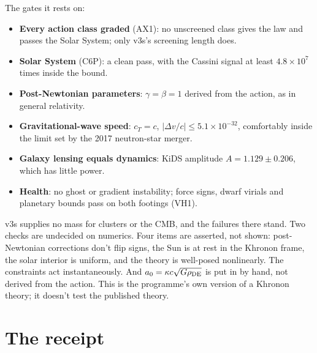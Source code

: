 The gates it rests on:
\begin{itemize}
\item \textbf{Every action class graded} (AX1): no unscreened class gives the law and passes the Solar System; only v3s's screening length does.
\item \textbf{Solar System} (C6P): a clean pass, with the Cassini signal at least $4.8\times10^7$ times inside the bound.
\item \textbf{Post-Newtonian parameters}: $\gamma=\beta=1$ derived from the action, as in general relativity.
\item \textbf{Gravitational-wave speed}: $c_T=c$, $|\Delta v/c|\le5.1\times10^{-32}$, comfortably inside the limit set by the 2017 neutron-star merger.
\item \textbf{Galaxy lensing equals dynamics}: KiDS amplitude $A=1.129\pm0.206$, which has little power.
\item \textbf{Health}: no ghost or gradient instability; force signs, dwarf virials and planetary bounds pass on both footings (VH1).
\end{itemize}





\begin{honestbox}
v3s supplies no mass for clusters or the CMB, and the failures there stand. Two checks are undecided on numerics. Four items are asserted, not shown: post-Newtonian corrections don't flip signs, the Sun is at rest in the Khronon frame, the solar interior is uniform, and the theory is well-posed nonlinearly. The constraints act instantaneously. And $a_0=\kappa c\sqrt{G\rho_{\rm DE}}$ is put in by hand, not derived from the action. This is the programme's own version of a Khronon theory; it doesn't test the published theory.
\end{honestbox}

\section{The receipt}

